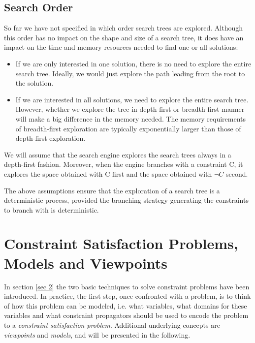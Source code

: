 \documentclass[a4paper]{scrartcl}
\begin{document}
\subsection{Search Order}
So far we have not specified in which order search trees 
are explored. Although this order 
has no impact on the shape and size of a search tree, 
it does have an impact on the time and
 memory resources needed to find one or all solutions:
\begin{itemize}
\item
If we are only interested in one solution, there is no 
need to explore the entire search tree. 
Ideally, we would just explore the path leading from the 
root to the solution.
\item
If we are interested in all solutions, we need to explore 
the entire search tree. However, 
whether we explore the tree in depth-first or breadth-first 
manner will make a big difference 
in the memory needed. The memory requirements of breadth-first 
exploration are typically 
exponentially larger than those of depth-first exploration.\\
\end{itemize}
We will assume that the search engine explores the search 
trees always in a depth-first fashion. 
Moreover, when the engine branches with a constraint C, 
it explores the space obtained with C 
first and the space obtained with $ \neg C$ second.\\
\par
The above assumptions ensure that the exploration of a 
search tree is a deterministic process, 
provided the branching strategy generating the 
constraints to branch with is deterministic.



\newpage
\section{Constraint Satisfaction Problems, Models and Viewpoints}
In section \ref{sec 2} the two basic techniques to solve
constraint problems have been introduced. In practice, 
the first step, once confronted with a problem, is to think
of how this problem can be modeled, i.e. what variables, what
domains for these variables and what constraint propagators
should be used to encode the problem to a {\it constraint
satisfaction problem}. Additional underlying concepts
are {\it viewpoints} and {\it models}, and will be 
presented in the following.
\end{document}
